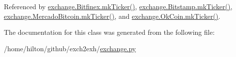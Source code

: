 Referenced by \hyperlink{exchange_8py_source_l00453}{exchange.\+Bitfinex.\+mk\+Ticker()}, \hyperlink{exchange_8py_source_l00525}{exchange.\+Bitstamp.\+mk\+Ticker()}, \hyperlink{exchange_8py_source_l00665}{exchange.\+Mercado\+Bitcoin.\+mk\+Ticker()}, and \hyperlink{exchange_8py_source_l00730}{exchange.\+Ok\+Coin.\+mk\+Ticker()}.



The documentation for this class was generated from the following file\+:\begin{DoxyCompactItemize}
\item 
/home/hilton/github/exch2exh/\hyperlink{exchange_8py}{exchange.\+py}\end{DoxyCompactItemize}
